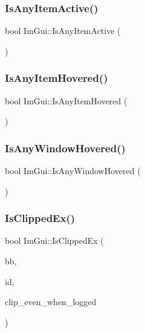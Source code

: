 \subsubsection{\texorpdfstring{Is\+Any\+Item\+Active()}{IsAnyItemActive()}}
{\footnotesize\ttfamily bool Im\+Gui\+::\+Is\+Any\+Item\+Active (\begin{DoxyParamCaption}{ }\end{DoxyParamCaption})}

\mbox{\label{namespace_im_gui_a0512146617bb55e24ebcfbe3ce6553d5}} 
\subsubsection{\texorpdfstring{Is\+Any\+Item\+Hovered()}{IsAnyItemHovered()}}
{\footnotesize\ttfamily bool Im\+Gui\+::\+Is\+Any\+Item\+Hovered (\begin{DoxyParamCaption}{ }\end{DoxyParamCaption})}

\mbox{\label{namespace_im_gui_a62379e94283e247288c9a6c15a2b797e}} 
\subsubsection{\texorpdfstring{Is\+Any\+Window\+Hovered()}{IsAnyWindowHovered()}}
{\footnotesize\ttfamily bool Im\+Gui\+::\+Is\+Any\+Window\+Hovered (\begin{DoxyParamCaption}{ }\end{DoxyParamCaption})}

\mbox{\label{namespace_im_gui_a8674467ae34d04bc99df1f7f98f47407}} 
\subsubsection{\texorpdfstring{Is\+Clipped\+Ex()}{IsClippedEx()}}
{\footnotesize\ttfamily bool Im\+Gui\+::\+Is\+Clipped\+Ex (\begin{DoxyParamCaption}\item[{const \mbox{\hyperlink{struct_im_rect}{Im\+Rect}} \&}]{bb,  }\item[{\mbox{\hyperlink{imgui_8h_a1785c9b6f4e16406764a85f32582236f}{Im\+Gui\+ID}}}]{id,  }\item[{bool}]{clip\+\_\+even\+\_\+when\+\_\+logged }\end{DoxyParamCaption})}

